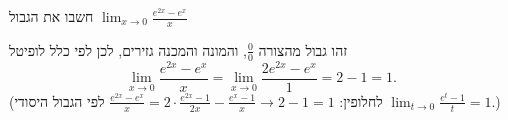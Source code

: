 
\begin{question}
חשבו את הגבול $\displaystyle\lim_{x\to0}\frac{e^{2x}-e^x}{x}$
\end{question}

\begin{solution}
זהו גבול מהצורה $\frac00$, והמונה והמכנה גזירים, לכן לפי כלל לופיטל
\[ \lim_{x\to0}\frac{e^{2x}-e^x}{x}=\lim_{x\to0}\frac{2e^{2x}-e^x}{1}=2-1=\boxed{1}. \]
(לחלופין: $\frac{e^{2x}-e^x}{x}=2\cdot\frac{e^{2x}-1}{2x}-\frac{e^x-1}{x}\to 2-1=1$ לפי הגבול היסודי $\lim_{t\to0}\frac{e^t-1}{t}=1$.)
\end{solution}
